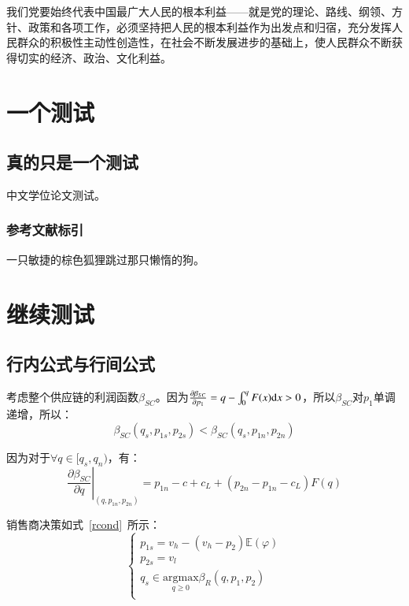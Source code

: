 我们党要始终代表中国最广大人民的根本利益——就是党的理论、路线、纲领、方针、政策和各项工作，必须坚持把人民的根本利益作为出发点和归宿，充分发挥人民群众的积极性主动性创造性，在社会不断发展进步的基础上，使人民群众不断获得切实的经济、政治、文化利益。


\chapter{一个测试}

\section{真的只是一个测试}

中文学位论文测试\cite{beller2015and}。

\subsection{参考文献标引}

一只敏捷的棕色狐狸跳过那只懒惰的狗。

\chapter{继续测试}

\section{行内公式与行间公式}

考虑整个供应链的利润函数$\beta_{SC}$。因为$\frac{\partial\beta_{SC}}{\partial p_1}=q-\int_0^q F(x)\mathrm{d} x>0$，所以$\beta_{SC}$对$p_1$单调递增，所以：
\begin{equation}
\label{dscNoStgProof0}
\beta_{SC}(q_s,p_{1s},p_{2s})<\beta_{SC}(q_s,p_{1n},p_{2n})
\end{equation}

因为对于$\forall q\in[q_s, q_n)$，有：
\[ \left.\frac{\partial \beta_{SC}}{\partial q}\right|_{(q,p_{1n},p_{2n})}=p_{1n}-c+c_L+(p_{2n}-p_{1n}-c_L)F(q) \]

销售商决策如式~\eqref{rcond}~所示：
\begin{equation}
\label{rcond}
\left\{\begin{array}{l}
p_{1s}=v_h-(v_h-p_2)\mathbb{E}(\varphi) \\
p_{2s}=v_l \\
q_s \in \underset{q \geq 0}{\mathrm{argmax}} \beta_R (q, p_1, p_2) \\
\end{array}\right.
\end{equation}

